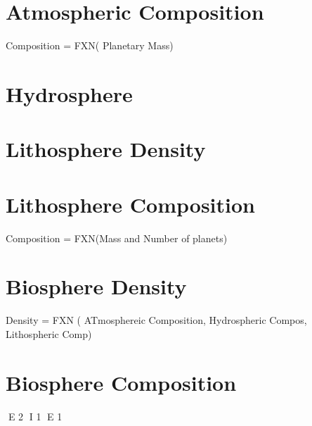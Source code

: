 \section{Atmospheric Composition}
Composition = FXN( Planetary Mass)
\section{Hydrosphere}
\section{Lithosphere Density}
\section{Lithosphere Composition}
Composition = FXN(Mass and Number of planets)
\section{Biosphere Density    }
Density = FXN ( ATmosphereic Composition, Hydrospheric Compos, 
Lithospheric Comp)
\section{Biosphere Composition}


E 2
I 1
E 1
